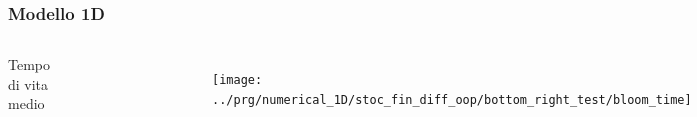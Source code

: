 \begin{frame}
  \frametitle{Modello 1D}
  \begin{columns}
    
    Tempo di vita medio
    \begin{figure}[!htb]
      \centering
      \includegraphics[width=\textwidth]{../img/huisman_lowvel_minimal_zoom}
    \end{figure}
 
    \begin{figure}[!htb]
      \centering
      \texttt{[image: ../prg/numerical\_1D/stoc\_fin\_diff\_oop/bottom\_right\_test/bloom\_time]}
    \end{figure}

  \end{columns}
\end{frame}

%
%
%


